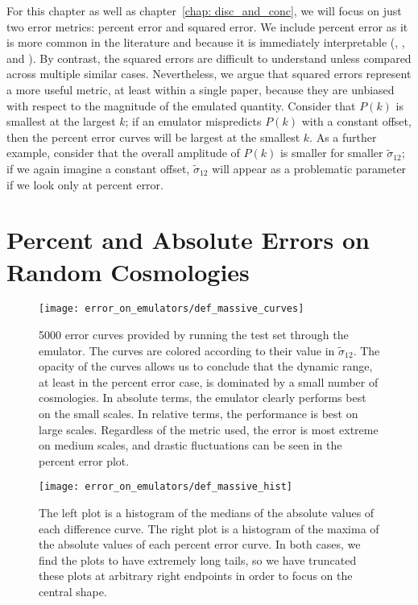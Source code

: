 For this chapter as well as chapter~\ref{chap: disc_and_conc}, we will focus
on just two error metrics: percent error and squared error. We include percent
error as it is more common in the literature and because it is immediately
interpretable (\citealp{Mancini}, \citealp{Arico}, and
\citealp{Eggemeier}). By contrast, the squared errors are difficult to
understand unless compared across multiple similar cases.
Nevertheless, we argue
that squared errors represent a more useful metric, at least within a single
paper, because they are unbiased with respect to the magnitude of the emulated
quantity. Consider that $P(k)$ is smallest at the largest $k$; if an emulator
mispredicts $P(k)$ with a constant offset, then the percent error curves will
be largest at the smallest $k$. As a further example, consider that the
overall amplitude of $P(k)$ is smaller for smaller $\tilde{\sigma}_{12}$;
if we again imagine a constant offset, $\tilde{\sigma}_{12}$ will appear as a
problematic parameter if we look only at percent error.


\section{Percent and Absolute Errors on Random Cosmologies}

\begin{figure}[ht!]
  \centering
  \texttt{[image: error\_on\_emulators/def\_massive\_curves]}
  \caption[Default Massive Emulator Error Curves]{5000 error curves provided 
  by running the test set through the emulator. The curves are colored
  according to their value in $\tilde{\sigma}_{12}$. The opacity of the curves
  allows us to conclude that the dynamic range, at least in the percent
  error case, is dominated by a small number of cosmologies.
  In absolute terms, the emulator
  clearly performs best on the small scales. In relative terms, the
  performance is best on large scales. Regardless of the metric used, the
  error is most extreme on medium scales, and drastic fluctuations can be seen 
  in the percent error plot.}
  \label{fig: def_massive_curves}
\end{figure}

\begin{figure}[ht!]
  \centering
  \texttt{[image: error\_on\_emulators/def\_massive\_hist]}
  \caption[Default Massive Emulator Error Histograms]{The left plot is a
  	histogram of the medians of the absolute values of each difference curve.
  	The right plot is a histogram of the maxima of the absolute values of
  	each percent error curve. In both cases, we find the plots to have
  	extremely long tails, so we have truncated these plots at arbitrary
  	right endpoints in order to focus on the central shape.}
  \label{fig: def_massive_hist}
\end{figure}

